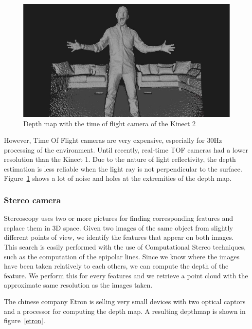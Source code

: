 \documentclass[12pt]{article}
\begin{document}
\begin{figure}[h]
  \centering
  \includegraphics[scale=0.3]{kinect2depth.jpg}
  \caption{\label{depthK2} Depth map with the time of flight camera of the Kinect 2}
\end{figure}

However, Time Of Flight cameras are very expensive, especially for 30Hz processing of the environment. Until recently, real-time TOF cameras had a lower resolution than the Kinect 1. Due to the nature of light reflectivity, the depth estimation is less reliable when the light ray is not perpendicular to the surface. Figure~\ref{depthK2} shows a lot of noise and holes at the extremities of the depth map.

\subsubsection{Stereo camera}
\label{subsec:stereocam}
Stereoscopy uses two or more pictures for finding corresponding features and replace them in 3D space. Given two images of the same object from slightly different points of view, we identify the features that appear on both images. This search is easily performed with the use of Computational Stereo techniques, such as the computation of the epipolar lines. Since we know where the images have been taken relatively to each others, we can compute the depth of the feature. We perform this for every features and we retrieve a point cloud with the approximate same resolution as the images taken.

The chinese company Etron is selling very small devices with two optical captors and a processor for computing the depth map. A resulting depthmap is shown in figure~\ref{etron}.
\end{document}
